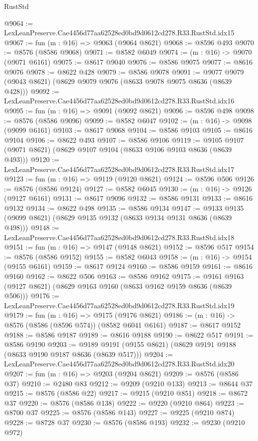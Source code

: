 \begin{lexlean}{RustStd}
\begin{coremodule}
@9064 := LexLeanPreserve.Cae4456d77aa62528ed0bd9d0612cd278.R33.RustStd.idx15
@9067 := fun (m : @16) => @9063 (@9064 @8621)
@9068 := @8596 @493
@9070 := @8576 (@8586 @9068)
@9071 := @8582 @6049
@9074 := (m : @16) -> @9070 (@9071 @6161)
@9075 := @8617 @9040
@9076 := @8586 @9075
@9077 := @8616 @9076
@9078 := @8622 @428
@9079 := @8586 @9078
@9091 := @9077 @9079 (@9043 @8621) (@8629 @9079 @9076 (@8633 @9078 @9075 @8636 (@8639 @428)))
@9092 := LexLeanPreserve.Cae4456d77aa62528ed0bd9d0612cd278.R33.RustStd.idx16
@9095 := fun (m : @16) => @9091 (@9092 @8621)
@9096 := @8596 @498
@9098 := @8576 (@8586 @9096)
@9099 := @8582 @6047
@9102 := (m : @16) -> @9098 (@9099 @6161)
@9103 := @8617 @9068
@9104 := @8586 @9103
@9105 := @8616 @9104
@9106 := @8622 @493
@9107 := @8586 @9106
@9119 := @9105 @9107 (@9071 @8621) (@8629 @9107 @9104 (@8633 @9106 @9103 @8636 (@8639 @493)))
@9120 := LexLeanPreserve.Cae4456d77aa62528ed0bd9d0612cd278.R33.RustStd.idx17
@9123 := fun (m : @16) => @9119 (@9120 @8621)
@9124 := @8596 @506
@9126 := @8576 (@8586 @9124)
@9127 := @8582 @6045
@9130 := (m : @16) -> @9126 (@9127 @6161)
@9131 := @8617 @9096
@9132 := @8586 @9131
@9133 := @8616 @9132
@9134 := @8622 @498
@9135 := @8586 @9134
@9147 := @9133 @9135 (@9099 @8621) (@8629 @9135 @9132 (@8633 @9134 @9131 @8636 (@8639 @498)))
@9148 := LexLeanPreserve.Cae4456d77aa62528ed0bd9d0612cd278.R33.RustStd.idx18
@9151 := fun (m : @16) => @9147 (@9148 @8621)
@9152 := @8596 @517
@9154 := @8576 (@8586 @9152)
@9155 := @8582 @6043
@9158 := (m : @16) -> @9154 (@9155 @6161)
@9159 := @8617 @9124
@9160 := @8586 @9159
@9161 := @8616 @9160
@9162 := @8622 @506
@9163 := @8586 @9162
@9175 := @9161 @9163 (@9127 @8621) (@8629 @9163 @9160 (@8633 @9162 @9159 @8636 (@8639 @506)))
@9176 := LexLeanPreserve.Cae4456d77aa62528ed0bd9d0612cd278.R33.RustStd.idx19
@9179 := fun (m : @16) => @9175 (@9176 @8621)
@9186 := (m : @16) -> @8576 (@8586 (@8596 @574)) (@8582 @6041 @6161)
@9187 := @8617 @9152
@9188 := @8586 @9187
@9189 := @8616 @9188
@9190 := @8622 @517
@9191 := @8586 @9190
@9203 := @9189 @9191 (@9155 @8621) (@8629 @9191 @9188 (@8633 @9190 @9187 @8636 (@8639 @517)))
@9204 := LexLeanPreserve.Cae4456d77aa62528ed0bd9d0612cd278.R33.RustStd.idx20
@9207 := fun (m : @16) => @9203 (@9204 @8621)
@9209 := @8576 (@8586 @37)
@9210 := @2480 @83
@9212 := @9209 (@9210 @133)
@9213 := @8644 @37
@9215 := @8576 (@8586 @22)
@9217 := @9215 (@9210 @851)
@9218 := @8672 @37
@9220 := @8576 (@8586 @138)
@9222 := @9220 (@9210 @864)
@9223 := @8700 @37
@9225 := @8576 (@8586 @143)
@9227 := @9225 (@9210 @874)
@9228 := @8728 @37
@9230 := @8576 (@8586 @193)
@9232 := @9230 (@9210 @972)

\end{coremodule}
\end{lexlean}
